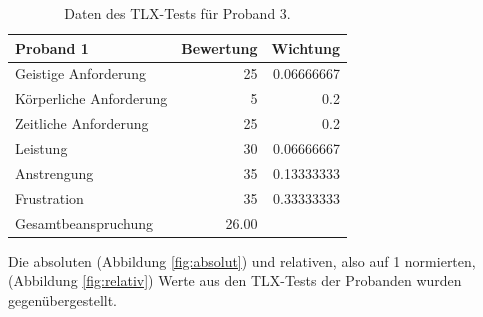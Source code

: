 \begin{table}[htb]
    \caption{\label{tab:tlx-proband3}Daten des TLX-Tests für Proband 3.}
    \centering
    \begin{tabular}{l r r}
        Proband 1 & Bewertung & Wichtung \\
        \hline
        Geistige Anforderung & 25 & 0.06666667 \\
        Körperliche Anforderung & 5 & 0.2 \\
        Zeitliche Anforderung & 25 & 0.2 \\
        Leistung & 30 & 0.06666667 \\
        Anstrengung & 35 & 0.13333333 \\
        Frustration & 35 & 0.33333333 \\
        \hline
        Gesamtbeanspruchung & 26.00 & \\
    \end{tabular}
\end{table}

Die absoluten (Abbildung \ref{fig:absolut}) und relativen, also auf 1 normierten, (Abbildung \ref{fig:relativ}) Werte aus den TLX-Tests der Probanden wurden gegenübergestellt.

\begin{figure}[H]
    \centering

\end{figure}
